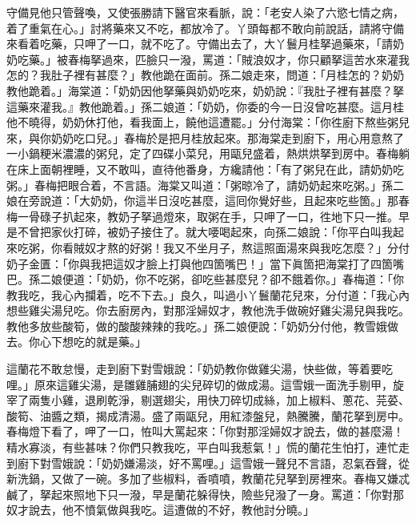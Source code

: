 守備見他只管聲喚，又使張勝請下醫官來看脈，說：「老安人染了六慾七情之病，着了重氣在心。」{}討將藥來又不吃，都放冷了。丫頭每都不敢向前說話，請將守備來看着吃藥，只呷了一口，就不吃了。{}守備出去了，大丫鬟月桂拏過藥來，「請奶奶吃藥。」被春梅拏過來，匹臉只一潑，罵道：「賊浪奴才，你只顧拏這苦水來灌我怎的？我肚子裡有甚麼？」教他跪在面前。孫二娘走來，問道：「月桂怎的？奶奶教他跪着。」海棠道：「奶奶因他拏藥與奶奶吃來，奶奶說：『我肚子裡有甚麼？拏這藥來灌我。』教他跪着。」孫二娘道：「奶奶，你委的今一日沒曾吃甚麼。這月桂他不曉得，奶奶休打他，看我面上，饒他這遭罷。」分付海棠：「你徃廚下熬些粥兒來，與你奶奶吃口兒。」春梅於是把月桂放起來。那海棠走到廚下，用心用意熬了一小鍋粳米濃濃的粥兒，定了四碟小菜兒，用甌兒盛着，熱烘烘拏到房中。春梅躺在床上面朝裡睡，又不敢叫，直待他番身，方纔請他：「有了粥兒在此，請奶奶吃粥。」春梅把眼合着，不言語。海棠又叫道：「粥晾冷了，請奶奶起來吃粥。」孫二娘在旁說道：「大奶奶，你這半日沒吃甚麼，這囘你覺好些，且起來吃些箇。」那春梅一骨碌子扒起來，教奶子拏過燈來，取粥在手，只呷了一口，徃地下只一推。{}早是不曾把家伙打碎，被奶子接住了。就大喓喝起來，向孫二娘說：「你平白叫我起來吃粥，你看賊奴才熬的好粥！我又不坐月子，熬這照面湯來與我吃怎麼？」分付奶子金匱：「你與我把這奴才臉上打與他四箇嘴巴！」當下眞箇把海棠打了四箇嘴巴。孫二娘便道：「奶奶，你不吃粥，卻吃些甚麼兒？卻不餓着你。」春梅道：「你教我吃，我心內攔着，吃不下去。」良久，叫過小丫鬟蘭花兒來，分付道：「我心內想些雞尖湯兒吃。{}你去廚房內，對那淫婦奴才，教他洗手做碗好雞尖湯兒與我吃。教他多放些酸筍，做的酸酸辣辣的我吃。」{}孫二娘便說：「奶奶分付他，教雪娥做去。你心下想吃的就是藥。」

這蘭花不敢怠慢，走到廚下對雪娥說：「奶奶教你做雞尖湯，快些做，等着要吃哩。」{}原來這雞尖湯，是雛雞脯翅的尖兒碎切的做成湯。這雪娥一面洗手剔甲，旋宰了兩隻小雞，退刷乾淨，剔選翅尖，用快刀碎切成絲，加上椒料、蔥花、芫荽、酸筍、油醬之類，揭成清湯。盛了兩甌兒，用紅漆盤兒，熱騰騰，蘭花拏到房中。春梅燈下看了，呷了一口，恠叫大罵起來：「你對那淫婦奴才說去，做的甚麼湯！精水寡淡，有些甚味？你們只教我吃，平白叫我惹氣！」慌的蘭花生怕打，連忙走到廚下對雪娥說：「奶奶嫌湯淡，好不罵哩。」這雪娥一聲兒不言語，忍氣吞聲，從新洗鍋，又做了一碗。多加了些椒料，香噴噴，教蘭花兒拏到房裡來。春梅又嫌忒鹹了，拏起來照地下只一潑，早是蘭花躲得快，險些兒潑了一身。罵道：「你對那奴才說去，他不憤氣做與我吃。這遭做的不好，教他討分曉。」{}

